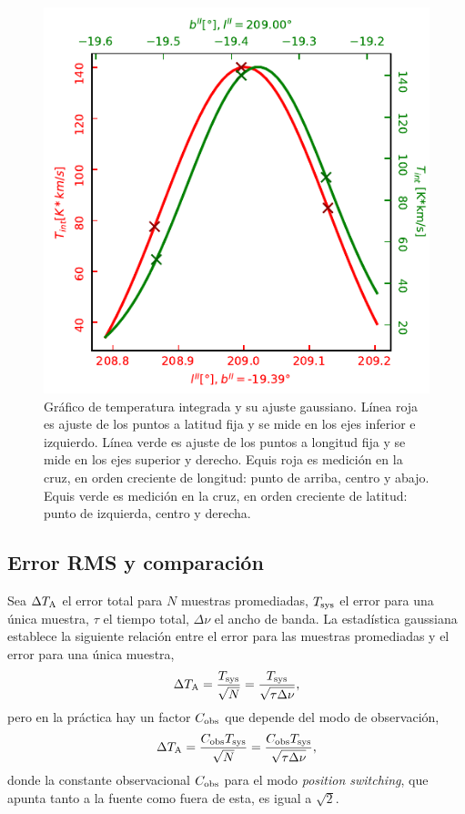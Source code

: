\begin{figure}[p]
	\centering
	\includegraphics{tint.pdf}
	\caption{Gráfico de temperatura integrada y su ajuste gaussiano. Línea roja es ajuste de los puntos a latitud fija y se mide en los ejes inferior e izquierdo. Línea verde es ajuste de los puntos a longitud fija y se mide en los ejes superior y derecho. Equis roja es medición en la cruz, en orden creciente de longitud: punto de arriba, centro y abajo. Equis verde es medición en la cruz, en orden creciente de latitud: punto de izquierda, centro y derecha.}
	\label{fig:tint}
\end{figure}

\subsection{Error RMS y comparación}

Sea $\Delta T_\textnormal{A}$ el error total para $N$ muestras promediadas, $T_\textnormal{sys}$ el error para una única muestra, $\tau$ el tiempo total, $\Delta\nu$ el ancho de banda. La estadística gaussiana establece la siguiente relación entre el error para las muestras promediadas y el error para una única muestra,
\begin{equation}
\Delta T_\textnormal{A}=\frac{T_\textnormal{sys}}{\sqrt{N}}=\frac{T_\textnormal{sys}}{\sqrt{\tau\Delta\nu}}\label{eq:rms1}
,\end{equation}
pero en la práctica hay un factor $C_\textnormal{obs}$ que depende del modo de observación,
\begin{equation}
\Delta T_\textnormal{A}=\frac{C_\textnormal{obs}T_\textnormal{sys}}{\sqrt{N}}=\frac{C_\textnormal{obs}T_\textnormal{sys}}{\sqrt{\tau\Delta\nu}}\label{eq:rms2}
,\end{equation}
donde la constante observacional $C_\textnormal{obs}$ para el modo \textit{position switching}, que apunta tanto a la fuente como fuera de esta, es igual a $\sqrt{2}$.

